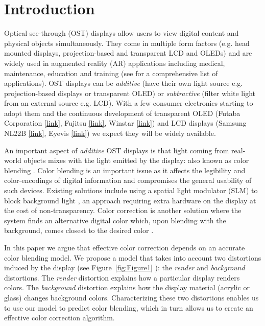 \documentclass[annual]{acmsiggraph}
\begin{document}
\section{Introduction}

Optical see-through (OST) displays allow users to view digital content and physical objects simultaneously. They come in multiple form factors (e.g. head mounted displays, projection-based and transparent LCD and OLEDs) and are widely used in augmented reality (AR) applications including medical, maintenance, education and training (see \cite{Epson2013}\cite{Lenovo2013} for a comprehensive list of applications). OST displays can be \textit{additive} (have their own light source e.g. projection-based displays or transparent OLED) or \textit{subtractive} (filter white light from an external source e.g. LCD). With a few consumer electronics starting to adopt them \cite{Lenovo2013} \cite{Epson2013}  and the continuous development of transparent OLED (Futaba Corporation \href{http://www.oled-info.com/futabas-oled-road-map-amoleds-2014-transparent-and-flexible-oleds-cars-2015}{[link]}, Fujitsu \href{http://www.fujitsu.com/be/Images/Workplace_of_the_Future.pdf} {[link]}, Winstar \href{http://www.winstar.com.tw/newspaper_ov.php?lang=en&ID=153}{[link]}) and LCD displays (Samsung NL22B \href{http://www.samsung.com/us/business/displays/digital-signage/} {[link]}, Eyevis \href{http://www.eyevis.de/index.php?article_id=163&clang=1} {[link]}) we expect they will be widely available.

An important aspect of \textit{additive} OST displays is that light coming from real-world objects mixes with the light emitted by the display: also known as color blending \cite{Gabbard:2010}. Color blending is an important issue as it affects the legibility and color-encodings of digital information and compromises the general usability of such devices. Existing solutions include using a spatial light modulator (SLM) to block background light \cite{Kiyokawa:2003}, an approach requiring extra hardware on the display at the cost of non-transparency. Color correction is another solution where the system finds an alternative digital color which, upon blending with the background, comes closest to the desired color \cite{Weiland:2009}.

In this paper we argue that effective color correction depends on an accurate color blending model. We propose a model that takes into account two distortions induced by the display (see Figure~\ref{fig:Figure1} ): the \textit{render} and \textit{background} distortions. The \textit{render} distortion explains how a particular display renders colors. The \textit{background} distortion explains how the display material (acrylic or glass) changes background colors. Characterizing these two distortions enables us to use our model to predict color blending, which in turn allows us to create an effective color correction algorithm.
\end{document}
